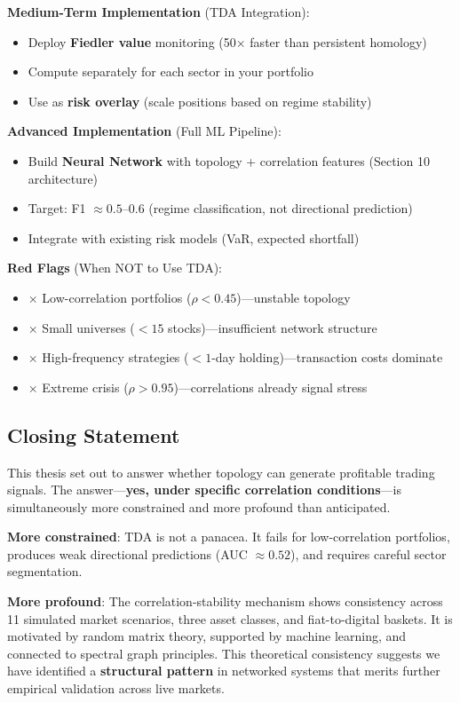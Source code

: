 \textbf{Medium-Term Implementation} (TDA Integration):
\begin{itemize}
\item Deploy \textbf{Fiedler value} monitoring (50$\times$ faster than persistent homology)
\item Compute separately for each sector in your portfolio
\item Use as \textbf{risk overlay} (scale positions based on regime stability)
\end{itemize}

\textbf{Advanced Implementation} (Full ML Pipeline):
\begin{itemize}
\item Build \textbf{Neural Network} with topology + correlation features (Section 10 architecture)
\item Target: F1 $\approx 0.5$--$0.6$ (regime classification, not directional prediction)
\item Integrate with existing risk models (VaR, expected shortfall)
\end{itemize}

\textbf{Red Flags} (When NOT to Use TDA):
\begin{itemize}
\item $\times$ Low-correlation portfolios ($\rho < 0.45$)---unstable topology
\item $\times$ Small universes ($< 15$ stocks)---insufficient network structure
\item $\times$ High-frequency strategies ($< 1$-day holding)---transaction costs dominate
\item $\times$ Extreme crisis ($\rho > 0.95$)---correlations already signal stress
\end{itemize}

\subsection{Closing Statement}

This thesis set out to answer whether topology can generate profitable trading signals. The answer---\textbf{yes, under specific correlation conditions}---is simultaneously more constrained and more profound than anticipated.

\textbf{More constrained}: TDA is not a panacea. It fails for low-correlation portfolios, produces weak directional predictions (AUC $\approx 0.52$), and requires careful sector segmentation.

\textbf{More profound}: The correlation-stability mechanism shows consistency across 11 simulated market scenarios, three asset classes, and fiat-to-digital baskets. It is motivated by random matrix theory, supported by machine learning, and connected to spectral graph principles. This theoretical consistency suggests we have identified a \textbf{structural pattern} in networked systems that merits further empirical validation across live markets.

